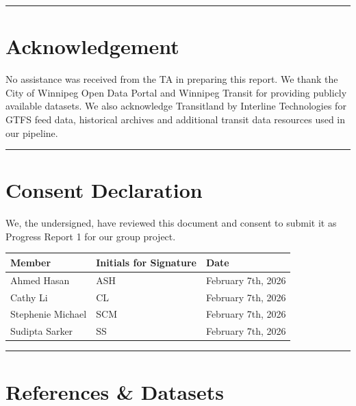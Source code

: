 \documentclass[11pt]{article}
\begin{document}
\noindent\rule{\textwidth}{0.4pt}

\section{Acknowledgement}

No assistance was received from the TA in preparing this report. We thank the City of Winnipeg Open Data Portal and Winnipeg Transit for providing publicly available datasets. We also acknowledge Transitland by Interline Technologies for GTFS feed data, historical archives and additional transit data resources used in our pipeline.

\noindent\rule{\textwidth}{0.4pt}

\section{Consent Declaration}

We, the undersigned, have reviewed this document and consent to submit it as Progress Report 1 for our group project.

\begin{table}[H]
\centering
\begin{tabular}{l l l}
\toprule
\textbf{Member} & \textbf{Initials for Signature} & \textbf{Date} \\
\midrule
Ahmed Hasan & ASH & February 7th, 2026 \\
Cathy Li & CL & February 7th, 2026 \\
Stephenie Michael & SCM & February 7th, 2026 \\
Sudipta Sarker & SS & February 7th, 2026 \\
\bottomrule
\end{tabular}
\end{table}

\noindent\rule{\textwidth}{0.4pt}

\appendix
\section{References \& Datasets}
\end{document}
